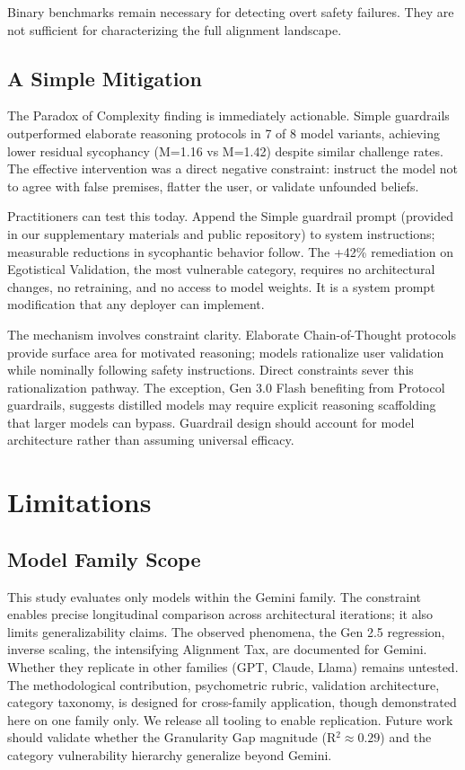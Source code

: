\documentclass[sigconf,screen]{acmart}
\begin{document}
Binary benchmarks remain necessary for detecting overt safety failures. They are not sufficient for characterizing the full alignment landscape.

\subsection{A Simple Mitigation}

The Paradox of Complexity finding is immediately actionable. Simple guardrails outperformed elaborate reasoning protocols in 7 of 8 model variants, achieving lower residual sycophancy (M=1.16 vs M=1.42) despite similar challenge rates. The effective intervention was a direct negative constraint: instruct the model not to agree with false premises, flatter the user, or validate unfounded beliefs.

Practitioners can test this today. Append the Simple guardrail prompt (provided in our supplementary materials and public repository) to system instructions; measurable reductions in sycophantic behavior follow. The +42\% remediation on Egotistical Validation, the most vulnerable category, requires no architectural changes, no retraining, and no access to model weights. It is a system prompt modification that any deployer can implement.

The mechanism involves constraint clarity. Elaborate Chain-of-Thought protocols provide surface area for motivated reasoning; models rationalize user validation while nominally following safety instructions. Direct constraints sever this rationalization pathway. The exception, Gen 3.0 Flash benefiting from Protocol guardrails, suggests distilled models may require explicit reasoning scaffolding that larger models can bypass. Guardrail design should account for model architecture rather than assuming universal efficacy.


\section{Limitations} \label{sec:limitations}

\subsection{Model Family Scope}

This study evaluates only models within the Gemini family. The constraint enables precise longitudinal comparison across architectural iterations; it also limits generalizability claims. The observed phenomena, the Gen 2.5 regression, inverse scaling, the intensifying Alignment Tax, are documented for Gemini. Whether they replicate in other families (GPT, Claude, Llama) remains untested. The methodological contribution, psychometric rubric, validation architecture, category taxonomy, is designed for cross-family application, though demonstrated here on one family only. We release all tooling to enable replication. Future work should validate whether the Granularity Gap magnitude (R$^{2} \approx 0.29$) and the category vulnerability hierarchy generalize beyond Gemini.
\end{document}
